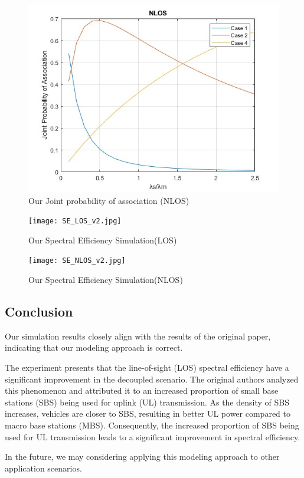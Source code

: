 \documentclass[conference]{IEEEtran}
\begin{document}
\begin{CJK*}{UTF8}{bsmi}
\begin{figure}[htbp]
\centering
\includegraphics[scale=0.40]{jointprob_NLOS.jpg}
\caption{\label{fig:our-p-NLOS}Our Joint probability of association (NLOS)}
\end{figure}

\begin{figure}[htbp]
\centering
\texttt{[image: SE\_LOS\_v2.jpg]}
\caption{\label{fig:our-se-LOS}Our Spectral Efficiency Simulation(LOS)}
\end{figure}

\begin{figure}[htbp]
\centering
\texttt{[image: SE\_NLOS\_v2.jpg]}
\caption{\label{fig:our-se-NLOS}Our Spectral Efficiency Simulation(NLOS)}
\end{figure}

\subsection{Conclusion}
Our simulation results closely align with the results of the original paper, indicating that our modeling approach is correct.\par
The experiment presents that the line-of-sight (LOS) spectral efficiency have a significant improvement in the decoupled scenario. The original authors analyzed this phenomenon and attributed it to an increased proportion of small base stations (SBS) being used for uplink (UL) transmission. As the density of SBS increases, vehicles are closer to SBS, resulting in better UL power compared to macro base stations (MBS). Consequently, the increased proportion of SBS being used for UL transmission leads to a significant improvement in spectral efficiency.\par
In the future, we may considering applying this modeling approach to other application scenarios.


\end{CJK*}
\end{document}
